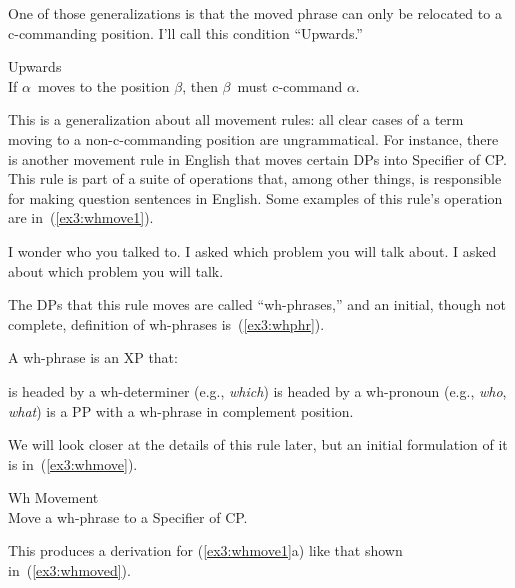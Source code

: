 One of those generalizations is that the moved phrase can only be relocated to a c-commanding position. I'll call this condition ``Upwards.''
\begin{exe}
\ex \label{ex3:ccommgen} Upwards\\
If $\alpha$\ moves to the position $\beta$, then $\beta$\ must c-command $\alpha$.
\end{exe}
This is a generalization about all movement rules: all clear cases of a term moving to a non-c-commanding position are ungrammatical.%
%
%
%
 For instance, there is another movement rule in English that moves certain DPs into Specifier of CP. This rule is part of a suite of operations that, among other things, is responsible for making question sentences in English. Some examples of this rule's operation are in~(\ref{ex3:whmove1}).
\begin{exe}
	\raggedright
	\ex \label{ex3:whmove1} 
	\begin{xlist}
		\ex I wonder who you talked to.
		\ex I asked which problem you will talk about.
		\ex I asked about which problem you will talk.
	\end{xlist}
\end{exe}
The DPs that this rule moves are called ``wh-phrases,'' and an initial, though not complete, definition of wh-phrases is~(\ref{ex3:whphr}).
\begin{exe}
	\raggedright
	\ex \label{ex3:whphr} A wh-phrase is an XP that:
	\begin{xlist}
		\ex is headed by a wh-determiner (e.g., \emph{which})
		\ex is headed by a wh-pronoun (e.g., \emph{who}, \emph{what})
		\ex is a PP with a wh-phrase in complement position.
	\end{xlist}
\end{exe}
We will look closer at the details of this rule later, but an initial formulation of it is in~(\ref{ex3:whmove}).
\begin{exe}
	\raggedright
	\ex \label{ex3:whmove} Wh Movement\\
	Move a wh-phrase to a Specifier of CP.
\end{exe}
\pagebreak
This produces a derivation for (\ref{ex3:whmove1}a) like that shown in~(\ref{ex3:whmoved}).
